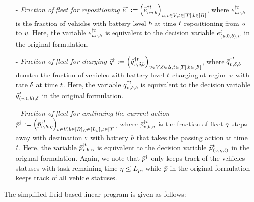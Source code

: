\begin{enumerate}
    \item[-] \emph{Fraction of fleet for repositioning $\bar{e}^{\dagger }_{} := \left(\bar{e}^{\dagger t}_{u v, b}\right)_{u,v \in V, t \in [T], b \in [B]}$}, where $\bar{e}^{\dagger t}_{u v, b}$ is the fraction of vehicles with battery level $b$ at time $t$ repositioning from $u$ to $v$. Here, the variable $\bar{e}^{\dagger t}_{u v, b}$ is equivalent to the decision variable $\bar{e}^{t}_{(u, 0, b), v}$ in the original formulation.
    \item[-] \emph{Fraction of fleet for charging $\bar{q}^{\dagger }_{} := \left(\bar{q}^{\dagger t}_{v, \delta,b}\right)_{v \in V, \delta \in \Delta, t \in [T], b \in [B]}$}, where $\bar{q}^{\dagger t}_{v, \delta, b}$ denotes the fraction of vehicles with battery level $b$ charging at region $v$ with rate $\delta$ at time $t$. Here, the variable $\bar{q}^{\dagger t}_{v, \delta, b}$ is equivalent to the decision variable $\bar{q}^{t}_{(v, 0, b), \delta}$ in the original formulation.
    \item[-] \emph{Fraction of fleet for continuing the current action $\bar{p}^{\dagger }_{} := \left(\bar{p}^{\dagger t}_{v, b, \eta}\right)_{v \in V, b \in[B], \eta \in [L_p], t \in [T]}$}, where $\bar{p}^{\dagger t}_{v, b, \eta}$ is the fraction of fleet $\eta$ steps away with destination $v$ with battery $b$ that takes the passing action at time $t$. Here, the variable $\bar{p}^{\dagger t}_{v, b, \eta}$ is equivalent to the decision variable $\bar{p}^{t}_{(v, \eta, b)}$ in the original formulation. Again, we note that $\bar{p}^{\dagger }_{}$ only keeps track of the vehicles statuses with task remaining time $\eta \leq L_p$, while $\bar{p}^{}_{}$ in the original formulation keeps track of all vehicle statuses.
\end{enumerate}

The simplified fluid-based linear program is given as follows: 

